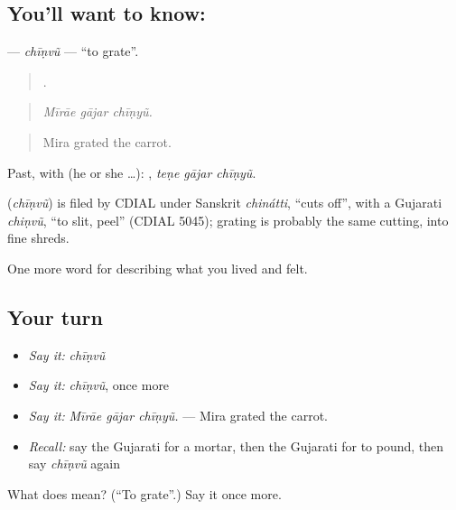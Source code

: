 \subsection*{You'll want to know: }
\textbf{} — \emph{chīṇvũ} — \textquotedblleft{}to grate\textquotedblright{}.

\begin{quote}
  .
\end{quote}

\begin{quote}
\emph{Mīrāe gājar chīṇyũ.}
\end{quote}

\begin{quote}
Mira grated the carrot.
\end{quote}

Past, with  (he or she …):   , \emph{teṇe gājar chīṇyũ}.

\begin{cousinweb}
\textbf{} (\emph{chīṇvũ}) is filed by CDIAL under Sanskrit \emph{chinátti}, \textquotedblleft{}cuts off\textquotedblright{}, with a Gujarati \emph{chiṇvũ}, \textquotedblleft{}to slit, peel\textquotedblright{} (CDIAL 5045); grating is probably the same cutting, into fine shreds.
\end{cousinweb}

\begin{grammarlens}[title={What you've built}]
One more word for describing what you lived and felt.
\end{grammarlens}

\subsection*{Your turn}
\begin{itemize}
\raggedright
  \item \emph{Say it:} \emph{chīṇvũ}
  \item \emph{Say it:} \emph{chīṇvũ}, once more
  \item \emph{Say it:} \emph{Mīrāe gājar chīṇyũ.} — Mira grated the carrot.
  \item \emph{Recall:} say the Gujarati for a mortar, then the Gujarati for to pound, then say \emph{chīṇvũ} again
\end{itemize}

\begin{tcolorbox}[breakable,colback=teal!4,colframe=teal!35!black,title={Before you move on}]
What does  mean? (\textquotedblleft{}To grate\textquotedblright{}.) Say it once more.
\end{tcolorbox}
